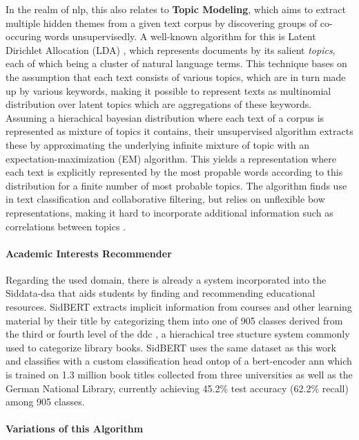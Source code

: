 In the realm of \gls{nlp}, this also relates to \textbf{Topic Modeling}, which aims to extract multiple hidden themes from a given text corpus by discovering groups of co-occuring words unsupervisedly. A well-known algorithm for this is Latent Dirichlet Allocation (LDA) \cite{Blei2003}, which represents documents by its salient \textit{topics}, each of which being a cluster of natural language terms. This technique bases on the assumption that each text consists of various topics, which are in turn made up by various keywords, making it possible to represent texts as multinomial distribution over latent topics which are aggregations of these keywords. Assuming a hierachical bayesian distribution where each text of a corpus is represented as mixture of topics it contains, their unsupervised algorithm extracts these by approximating the underlying infinite mixture of topic with an expectation-maximization (EM) algorithm. This yields a representation where each text is explicitly represented by the most propable words according to this distribution for a finite number of most probable topics. The algorithm finds use in text classification and collaborative filtering, but relies on unflexible \gls{bow} representations, making it hard to incorporate additional information such as correlations between topics \cite{Ager2018}.


\paragraph{Academic Interests Recommender}
\label{sec:sidbert}
Regarding the used domain, there is already a system incorporated into the Siddata-\gls{dsa} that aids students by finding and recommending educational resources. SidBERT \cite{Schrumpf2021DELPHI} extracts implicit information from courses and other learning material by their title by categorizing them into one of 905 classes derived from the third or fourth level of the \gls{ddc} \cite{Dewey1876}, a hierachical tree stucture system commonly used to categorize library books. SidBERT uses the same dataset as this work and classifies with a custom classification head ontop of a \gls{bert}-encoder \gls{ann} which is trained on 1.3 million book titles collected from three universities as well as the German National Library, currently achieving 45.2\% test accuracy (62.2\% recall) among 905 classes.

\paragraph{Variations of this Algorithm}
\label{sec:algo_variants}

